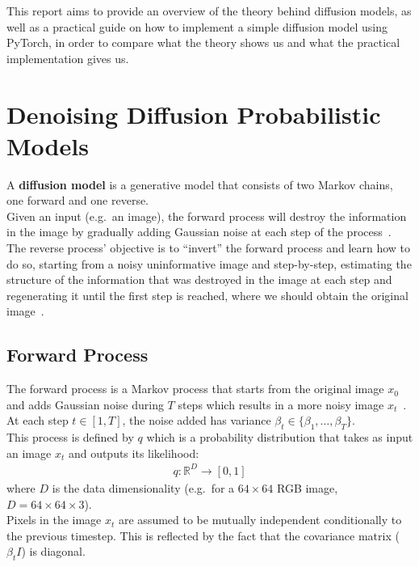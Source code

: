 \documentclass[twoside]{article}
\numberwithin{equation}{section}
\numberwithin{figure}{section}
\begin{document}
This report aims to provide an overview of the theory behind diffusion models, as well as a practical guide on how to implement a simple diffusion model using PyTorch, in order to compare what the theory shows us and what the practical implementation gives us.

\newpage
\section{Denoising Diffusion Probabilistic Models}
A \textbf{diffusion model} is a generative model that consists of two Markov chains, one forward and one reverse. \\
Given an input (e.g.\ an image), the forward process will destroy the information in the image by gradually adding Gaussian noise at each step of the process~\cite{ho2020denoising}. \\
The reverse process' objective is to ``invert'' the forward process and learn how to do so, starting from a noisy uninformative image and step-by-step, estimating the structure of the information that was destroyed in the image at each step and regenerating it until the first step is reached, where we should obtain the original image~\cite{ho2020denoising}.

\subsection{Forward Process}

The forward process is a Markov process that starts from the original image $x_0$ and adds Gaussian noise during $T$ steps which results in a more noisy image $x_t$~\cite{ho2020denoising}. \\
At each step $t \in \left[1, T\right]$, the noise added has variance $\beta_t \in \{ \beta_1, \dots, \beta_T \}$. \\ 
This process is defined by $q$ which is a probability distribution that takes as input an image $x_{t}$ and outputs its likelihood:
\begin{align}
  q: \mathbb{R}^D \rightarrow [0, 1]
\end{align}
where $D$ is the data dimensionality (e.g.\ for a $64 \times 64$ RGB image, $D = 64 \times 64 \times 3$). \\
Pixels in the image $x_t$ are assumed to be mutually independent conditionally to the previous timestep. This is reflected by the fact that the covariance matrix ($\beta_t I$) is diagonal.
\end{document}
